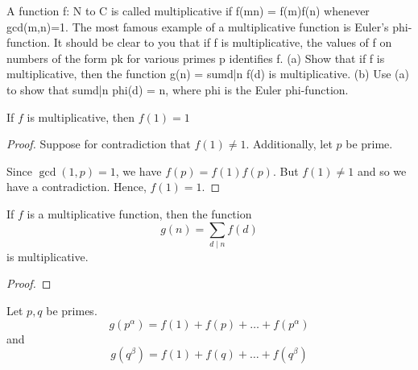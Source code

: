 
A function f: N to C is called multiplicative if f(mn) = f(m)f(n) whenever gcd(m,n)=1. The most famous example of a multiplicative function is Euler's phi-function. It should be clear to you that if f is multiplicative, the values of f on numbers of the form pk for various primes p identifies f. 
(a) Show that if f is multiplicative, then the function g(n) = sumd|n f(d) is multiplicative. 
(b) Use (a) to show that sumd|n phi(d) = n, where phi is the Euler phi-function. 

\begin{lemma}
    If $f$ is multiplicative, then $f(1) = 1$
\end{lemma}
\begin{proof}
    Suppose for contradiction that $f(1) \neq 1$. Additionally, let $p$ be
    prime.
    
    Since $\gcd(1, p) = 1$, we have $f(p) = f(1)f(p)$. But $f(1) \neq 1$ and so 
    we have a contradiction. Hence, $f(1) = 1$. 
\end{proof}

\begin{prop}[part a]
    If $f$ is a multiplicative function, then the function
    \[ g(n) = \sum_{d \mid n} f(d) \]
    is multiplicative.
\end{prop}
\begin{proof}
\end{proof}
    Let $p, q$ be primes. 
    \[ g(p^\alpha) = f(1) + f(p) + \ldots + f(p^\alpha) \]
    and
    \[ g(q^\beta) = f(1) + f(q) + \ldots + f(q^\beta) \]
    
